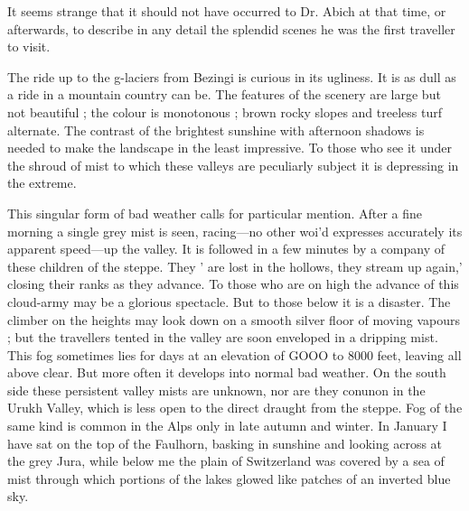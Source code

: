 \documentclass{article}
\begin{document}
	It seems strange that it should not have occurred to Dr. Abich at that time, or afterwards, to describe in any detail the splendid scenes he was the first traveller to visit.
	
	The ride up to the g-laciers from Bezingi is curious in its ugliness. It is as dull as a ride in a mountain country can be. The features of the scenery are large but not beautiful ; the colour is monotonous ; brown rocky slopes and treeless turf alternate. The contrast of the brightest sunshine with afternoon shadows is needed to make the landscape in the least impressive. To those who see it under the shroud of mist to which these valleys are peculiarly subject it is depressing in the extreme.
	
	This singular form of bad weather calls for particular mention. After a fine morning a single grey mist is seen, racing—no other woi'd expresses accurately its apparent speed—up the valley. It is followed in a few minutes by a company of these children of the steppe. They ' are lost in the hollows, they stream up again,' closing their ranks as they advance. To those who are on high the advance of this cloud-army may be a glorious spectacle. But to those below it is a disaster. The climber on the heights may look down on a smooth silver floor of moving vapours ; but the travellers tented in the valley are soon enveloped in a dripping mist. This fog sometimes lies for days at an elevation of GOOO to 8000 feet, leaving all above clear. But more often it develops into normal bad weather. On the south side these persistent valley mists are unknown, nor are they conunon in the Urukh Valley, which is less open to the direct draught from the steppe. Fog of the same kind is common in the Alps only in late autumn and winter. In January I have sat on the top of the Faulhorn, basking in sunshine and looking across at the grey Jura, while below me the plain of Switzerland was covered by a sea of mist through which portions of the lakes glowed like patches of an inverted blue sky.
	
\end{document}
